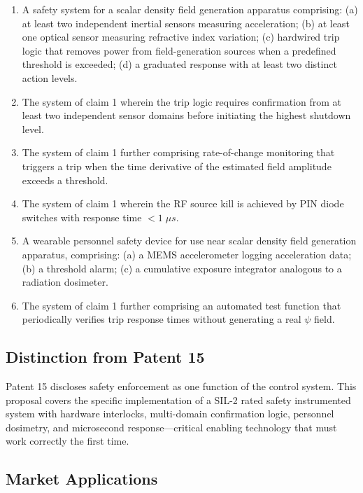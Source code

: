\documentclass[11pt,a4paper]{article}
\begin{document}
\begin{enumerate}
\item A safety system for a scalar density field generation
apparatus comprising: (a) at least two independent inertial
sensors measuring acceleration; (b) at least one optical sensor
measuring refractive index variation; (c) hardwired trip logic
that removes power from field-generation sources when a
predefined threshold is exceeded; (d) a graduated response
with at least two distinct action levels.

\item The system of claim 1 wherein the trip logic requires
confirmation from at least two independent sensor domains
before initiating the highest shutdown level.

\item The system of claim 1 further comprising rate-of-change
monitoring that triggers a trip when the time derivative of
the estimated field amplitude exceeds a threshold.

\item The system of claim 1 wherein the RF source kill is
achieved by PIN diode switches with response time
$< 1\;\si{\mu s}$.

\item A wearable personnel safety device for use near scalar
density field generation apparatus, comprising: (a) a MEMS
accelerometer logging acceleration data; (b) a threshold alarm;
(c) a cumulative exposure integrator analogous to a radiation
dosimeter.

\item The system of claim 1 further comprising an automated
test function that periodically verifies trip response times
without generating a real $\psi$ field.
\end{enumerate}

\subsection{Distinction from Patent 15}

Patent 15 discloses safety enforcement as one function of the
control system.  This proposal covers the specific
implementation of a SIL-2 rated safety instrumented system with
hardware interlocks, multi-domain confirmation logic, personnel
dosimetry, and microsecond response---critical enabling
technology that must work correctly the first time.

\subsection{Market Applications}
\end{document}
